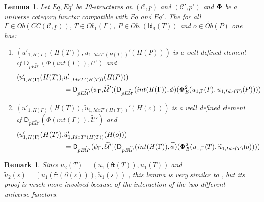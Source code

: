 \documentclass[12pt]{article}
\numberwithin{equation}{section}
\newtheorem{lemma}[proposition]{Lemma}
\newtheorem{remark}[proposition]{Remark}
\newcommand{\llabel}[1]{\label{#1}}
\newcommand{\wt}{\widetilde}
\newcommand{\toCC}{CC} %
\newcommand{\C}{{\mathcal C}}  %
\newcommand{\ft}{\mathsf{ft}}
\newcommand{\Idx}{\mathsf{Id_3}} %
\newcommand{\U}{\mathcal{U}}
\newcommand{\D}{\mathsf{D}}
\newcommand{\Obwt}{\wt{Ob}}
\begin{document}
\begin{lemma}
\llabel{2015.05.06.l3} Let $Eq, Eq'$ be J0-structures on $({\C},p)$ and
$({\C}',p')$ and $\bf\Phi$ be a universe category functor compatible
with $Eq$ and $Eq'$. The for all $\Gamma\in Ob(\toCC({\C},p))$, $T\in
Ob_1(\Gamma)$, $P\in Ob_1(\Idx(T))$ and $o\in \Obwt(P)$ one has:
%
\begin{enumerate}
\item $(u'_{1,H(\Gamma)}(H(T)), u_{1,IdxT'(H(T))}'(H(P)))$ is a well defined
  element of $\D_{pE\wt{\U}'}(\Phi(int(\Gamma)),U')$ and
%
  \begin{align*}
    (u'_{1,H(\Gamma)}(H(T)), & u_{1,IdxT'(H(T))}'(H(P))) \\
    & = \D_{pE\wt{\U}'}(\psi_{\Gamma},\wt{\U}')(\D_{pE\wt{\U}'}(int(H(\Gamma)),\phi)({\bf\Phi}_{E}^2(u_{1,\Gamma}(T),u_{1,Idx(T)}(P))))
  \end{align*}
\item $(u'_{1,H(\Gamma)}(H(T)), \wt{u}_{1,IdxT'(H(T))}'(H(o)))$ is a well
  defined element of $\D_{pE\wt{\U}'}(\Phi(int(\Gamma)),\wt{\U}')$ and
%
  \begin{align*}
    (u'_{1,H(\Gamma)}(H(T)), & \wt{u}_{1,IdxT'(H(T))}'(H(o))) \\
    & = \D_{pE\wt{\U}'}(\psi_{\Gamma},\wt{\U}')(\D_{pE\wt{\U}'}(int(H(\Gamma)),\wt{\phi})({\bf\Phi}_{E}^2(u_{1,\Gamma}(T),\wt{u}_{1,Idx(T)}(o))))
  \end{align*}
\end{enumerate}
\end{lemma}
%
\begin{remark}\rm
Since $u_2(T)=(u_1(\ft(T)),u_1(T))$ and
$\wt{u}_2(s)=(u_1(\ft(\partial(s))),\wt{u}_1(s))$ , this lemma is very similar
to \cite[Lemma 6.1(3,4)]{fromunivwithPi}, but its proof is much more involved
because of the interaction of the two different universe functors.
\end{remark}
%
\end{document}
